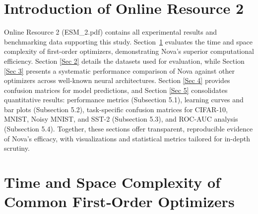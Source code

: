 \documentclass{article}
\begin{document}
\tableofcontents

\newpage

\section*{Introduction of Online Resource 2 }

Online Resource 2 (ESM\_2.pdf) contains all experimental results and benchmarking data supporting this study.  Section~\ref{Sec 1} evaluates the time and space complexity of first-order optimizers, demonstrating Nova's superior computational efficiency.  Section \ref{Sec 2} details the datasets used for evaluation, while Section \ref{Sec 3} presents a systematic performance comparison of Nova against other optimizers across well-known neural architectures. Section \ref{Sec 4} provides confusion matrices for model predictions, and Section \ref{Sec 5} consolidates quantitative results: performance metrics (Subsection 5.1), learning curves and bar plots (Subsection 5.2), task-specific confusion matrices for CIFAR-10, MNIST, Noisy MNIST, and SST-2 (Subsection 5.3), and ROC-AUC analysis (Subsection 5.4). Together, these sections offer transparent, reproducible evidence of Nova’s efficacy, with visualizations and statistical metrics tailored for in-depth scrutiny.



\section{Time and Space Complexity of Common First‐Order Optimizers}\label{Sec 1}
\end{document}

